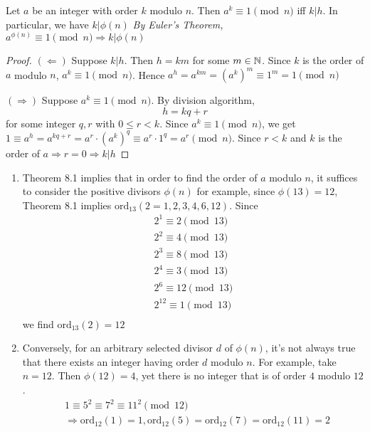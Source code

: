 \begin{theorem}
    Let $a$ be an integer with order $k$ modulo $n$. Then $a^k \equiv 1 \pmod n$ 
    iff $k | h$. In particular, we have $k | \phi(n)$\newline
    \emph{By Euler's Theorem, $a^{\phi(n)} \equiv 1 \pmod n \Rightarrow k | \phi(n)$}

\end{theorem}
\begin{proof}
    $(\Leftarrow)$ Suppose $k|h$. Then $h = km$ for some $m \in \mathbb{N}$.
    Since $k$ is the order of $a$ modulo $n$, $a^k \equiv 1 \pmod n$.
    Hence $a^h = a^{km} = {(a^k)}^m \equiv 1^m = 1 \pmod n$

    $(\Rightarrow)$ Suppose $a^k \equiv 1 \pmod n$. By division algorithm,
    \[
        h = kq+r
    \]
    for some integer $q, r$ with $0 \leq r < k$. Since $a^k \equiv 1 \pmod n$, 
    we get $1 \equiv a^h = a^{kq+r} = a^r \cdot {(a^k)}^q \equiv a^r \cdot 1^q = a^r \pmod n$.
    Since $r < k$ and $k$ is the order of $a \Rightarrow r = 0 \Rightarrow k | h$
\end{proof}

\begin{remark}
    \begin{enumerate}
        \item Theorem 8.1 implies that in order to find the order of $a$ modulo $n$, it suffices to consider the positive divisors $\phi(n)$
        for example, since $\phi(13) = 12$, Theorem 8.1 implies $\text{ord}_{13}(2 = 1, 2, 3, 4, 6, 12)$. Since
        \[
            \begin{aligned}
                2^1 \equiv 2 \pmod 13 \\
                2^2 \equiv 4 \pmod 13 \\
                2^3 \equiv 8 \pmod 13 \\
                2^4 \equiv 3 \pmod 13 \\
                2^6 \equiv 12 \pmod 13 \\
                2^{12} \equiv 1 \pmod 13 \\
            \end{aligned}
        \] 
        we find $\text{ord}_{13}(2) = 12$

        \item Conversely, for an arbitrary selected divisor $d$ of $\phi(n)$, it's not always true
        that there exists an integer having order $d$ modulo $n$. For example, take $n = 12$.
        Then $\phi(12) = 4$, yet there is no integer that is of order $4$ modulo $12$.
        \[
            \begin{aligned}
                &1 \equiv 5^2 \equiv 7^2 \equiv 11^2 \pmod{12} \\
                &\Rightarrow \text{ord}_{12}(1) = 1, \text{ord}_{12}(5) = \text{ord}_{12}(7) = \text{ord}_{12}(11) = 2
            \end{aligned}
        \]
    \end{enumerate}
\end{remark}

